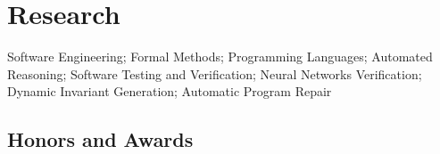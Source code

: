 \documentclass[11pt]{article}
\begin{document}
  
\section{Research}

  \begin{description}[before=\small]
  \item Software Engineering; Formal Methods; Programming Languages; Automated Reasoning; Software Testing and Verification; Neural Networks Verification; Dynamic Invariant Generation; Automatic Program Repair  
    \end{description}

\subsection{Honors and Awards}
\end{document}
